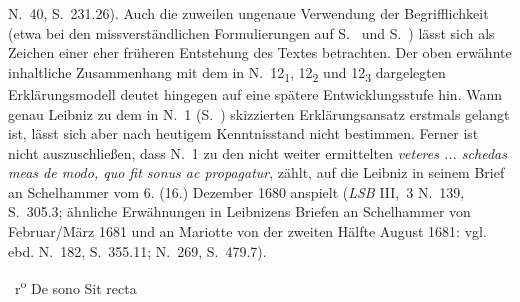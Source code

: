 \begin{ledgroup}
N.~40, S.~231.26\cite{00256}).
Auch die zuweilen ungenaue Verwendung der Begrifflichkeit (etwa bei den missverständlichen Formulierungen %
auf S.~ und S.~) lässt sich als Zeichen einer eher früheren Entstehung des Textes betrachten.
Der oben erwähnte inhaltliche Zusammenhang mit dem in N.~12\textsubscript{1}, 12\textsubscript{2} und 12\textsubscript{3} dargelegten Erklärungsmodell deutet hingegen auf eine spätere Entwicklungsstufe hin.
Wann genau Leibniz zu dem in N.~1 (S.~) skizzierten Erklärungsansatz erstmals gelangt ist, lässt sich aber nach heutigem Kenntnisstand nicht bestimmen.
\pend
\pstart
Ferner ist nicht auszuschließen, dass N.~1 zu den nicht weiter ermittelten \textit{veteres ... schedas meas de modo, quo fit sonus ac propagatur}, zählt, auf die Leibniz in seinem Brief an Schelhammer vom 6. (16.) Dezember 1680 anspielt (\cite{01275}\textit{LSB} III,~3 N.~139, S.~305.3; ähnliche Erwähnungen in Leibnizens Briefen an Schelhammer von Februar/März 1681 und an Mariotte von der zweiten Hälfte August 1681: vgl. ebd. \cite{01194}N.~182, S.~355.11; N.~269, \cite{01193}S.~479.7). 
\pend
\end{ledgroup}
%
\newpage
%
%
\count{}
\count{}
\count{}
%
%
\pstart%
\normalsize%
\noindent%
~r\textsuperscript{o}\rbrack
\pend%
\pstart%
\centering%
De sono\protect{}
\pend%
\vspace*{0.5em}%
%
\pstart%
\noindent%
Sit recta\protect{}
